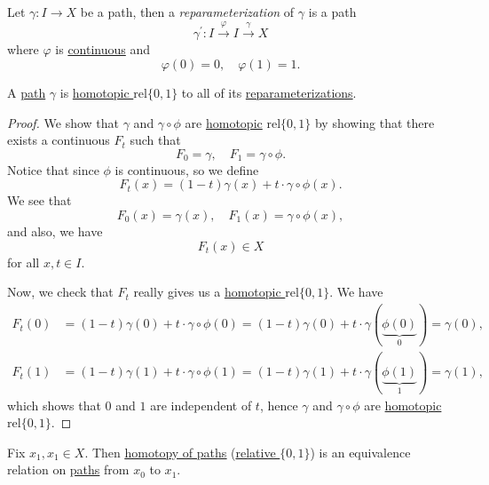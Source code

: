 \begin{definition}[Reparameterization]\label{def:reparameterization}
	Let \(\gamma\colon I\to X\) be a path, then a \emph{reparameterization} of \(\gamma\) is a path
	\[
		\gamma ^\prime \colon I\overset{\varphi }{\longrightarrow} I\overset{\gamma}{\longrightarrow} X
	\]
	where \(\varphi \) is \underline{continuous} and
	\[
		\varphi (0) = 0,\quad \varphi (1) = 1.
	\]
\end{definition}

\begin{exercise}
	A \hyperref[def:path]{path} \(\gamma\) is \hyperref[def:homotopy-relative]{homotopic \(\mathrm{rel} \{0, 1\}\)} to all of its
	\hyperref[def:reparameterization]{reparameterizations}.
\end{exercise}
\begin{proof}
	\par We show that \(\gamma\) and \(\gamma\circ \phi \) are \hyperref[def:homotopic]{homotopic} \(\mathrm{rel} \{0, 1\}\) by showing that
	there exists a continuous \(F_t\) such that
	\[
		F_0 = \gamma,\quad F_1 = \gamma\circ \phi.
	\]
	Notice that since \(\phi \) is continuous, so we define
	\[
		F_t(x) = (1 - t) \gamma(x) + t\cdot \gamma\circ \phi (x).
	\]
	We see that
	\[
		F_0(x) = \gamma(x),\quad F_1(x) = \gamma\circ \phi (x),
	\]
	and also, we have
	\[
		F_t(x)\in X
	\]
	for all \(x, t\in I\).

	\par Now, we check that \(F_t\) really gives us a \hyperref[def:homotopy-relative]{homotopic \(\mathrm{rel} \{0, 1\}\)}. We have
	\[
		\begin{split}
			F_t(0) &= (1 - t)\gamma(0) + t\cdot \gamma\circ \phi (0) = (1 - t)\gamma(0) + t\cdot \gamma(\underbrace{\phi (0)}_{0}) = \gamma(0),\\
			F_t(1) &= (1 - t)\gamma(1) + t\cdot \gamma\circ \phi (1) = (1 - t)\gamma(1) + t\cdot \gamma(\underbrace{\phi (1)}_{1}) = \gamma(1),
		\end{split}
	\]
	which shows that \(0\) and \(1\) are independent of \(t\), hence \(\gamma\) and \(\gamma\circ \phi \) are \hyperref[def:homotopy-relative]{homotopic \(\mathrm{rel} \{0, 1\}\)}.
\end{proof}

\begin{exercise}
	Fix \(x_1, x_1\in X\). Then \hyperref[def:homotopy-path]{\underline{homotopy of paths}} (\hyperref[def:homotopy-relative]{relative \(\{0, 1\}\)}) is an
	equivalence relation on \hyperref[def:path]{paths} from \(x_0\) to \(x_1\).
\end{exercise}


